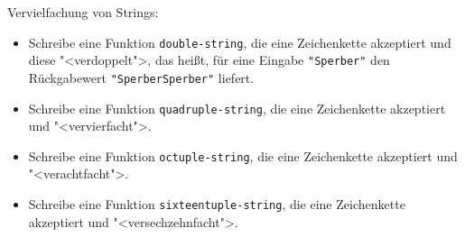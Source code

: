 \begin{aufgabe}
 Vervielfachung von Strings:
 \begin{itemize}
  \item Schreibe eine Funktion \texttt{double-string}, die eine Zeichenkette akzeptiert und
    diese "<verdoppelt">, das heißt, für eine Eingabe \verb|"Sperber"| den
    Rückgabewert \verb|"SperberSperber"| liefert.
    
  \item Schreibe eine Funktion \texttt{quadruple-string}, die eine
    Zeichenkette akzeptiert und "<vervierfacht">.

  \item Schreibe eine Funktion \texttt{octuple-string}, die eine
    Zeichenkette akzeptiert und "<verachtfacht">.

  \item Schreibe eine Funktion \texttt{sixteentuple-string}, die
    eine Zeichenkette akzeptiert und "<versechzehnfacht">.
  \end{itemize}


\end{aufgabe}

